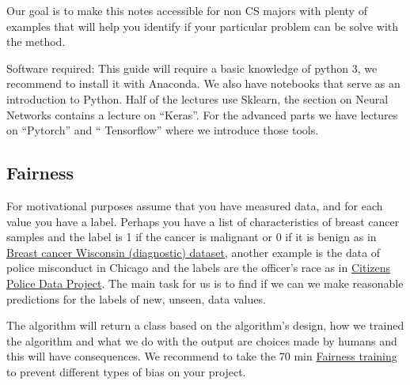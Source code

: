 \documentclass[11pt,letterpaper]{report}
\begin{document}
		Our goal is to make this notes accessible for non CS majors with plenty of examples that will help you identify if your particular problem can be solve with the method.
	
	Software required:
	This guide will require a basic knowledge of python 3, we recommend to install it with Anaconda. We also have notebooks that serve as an introduction to Python.
	Half of the lectures use  Sklearn, the section on Neural Networks contains a lecture on ``Keras''. For the advanced parts we have lectures on ``Pytorch'' and `` Tensorflow'' where we introduce those tools.
	
	
	
    \subsection{Fairness}
	For motivational purposes assume that you have measured data, and for each value you have a label. Perhaps you have a list of characteristics of breast cancer samples and the label is 1 if the cancer is malignant or 0 if it is benign as in \href{https://scikit-learn.org/stable/datasets/index.html#breast-cancer-dataset}{Breast cancer Wisconsin (diagnostic) dataset}, another example is the data of police misconduct in Chicago and the labels are the officer's race as in \href{https://data.cpdp.co/data/L5rG3q/}{Citizens Police Data Project}. The main task for us is to find if we can we make reasonable predictions for the labels of new, unseen, data values.

    The algorithm will return a class based on the algorithm's design, how we trained the algorithm and what we do with the output are choices made by humans and this will have consequences. We recommend to take the 70 min \href{https://developers.google.com/machine-learning/crash-course/fairness/video-lecture?utm_source=keyword-blog&utm_medium=blog&utm_campaign=mle-outreach&utm_term=&utm_content=mlcc-fairness}{Fairness training} to prevent different types of bias on your project. 
\end{document}
